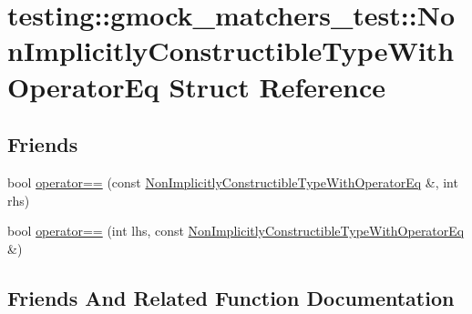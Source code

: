\hypertarget{structtesting_1_1gmock__matchers__test_1_1NonImplicitlyConstructibleTypeWithOperatorEq}{}\section{testing\+::gmock\+\_\+matchers\+\_\+test\+::Non\+Implicitly\+Constructible\+Type\+With\+Operator\+Eq Struct Reference}
\label{structtesting_1_1gmock__matchers__test_1_1NonImplicitlyConstructibleTypeWithOperatorEq}
\subsection*{Friends}
\begin{DoxyCompactItemize}
\item 
bool \mbox{\hyperlink{structtesting_1_1gmock__matchers__test_1_1NonImplicitlyConstructibleTypeWithOperatorEq_a20e9067f1f4becd397742e0db7351d6a}{operator==}} (const \mbox{\hyperlink{structtesting_1_1gmock__matchers__test_1_1NonImplicitlyConstructibleTypeWithOperatorEq}{Non\+Implicitly\+Constructible\+Type\+With\+Operator\+Eq}} \&, int rhs)
\item 
bool \mbox{\hyperlink{structtesting_1_1gmock__matchers__test_1_1NonImplicitlyConstructibleTypeWithOperatorEq_a801c8151d7f7ff24243019980934d143}{operator==}} (int lhs, const \mbox{\hyperlink{structtesting_1_1gmock__matchers__test_1_1NonImplicitlyConstructibleTypeWithOperatorEq}{Non\+Implicitly\+Constructible\+Type\+With\+Operator\+Eq}} \&)
\end{DoxyCompactItemize}


\subsection{Friends And Related Function Documentation}
\mbox{\label{structtesting_1_1gmock__matchers__test_1_1NonImplicitlyConstructibleTypeWithOperatorEq_a20e9067f1f4becd397742e0db7351d6a}} 
